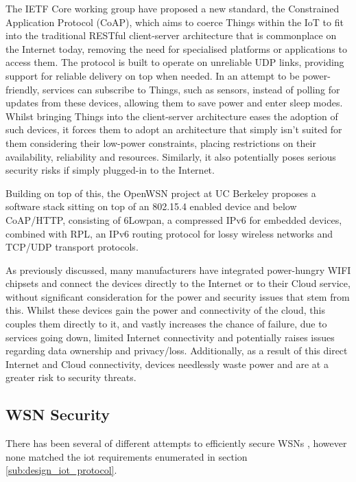 \documentclass[conference]{./sty/IEEEtran}
\begin{document}
The IETF Core working group have proposed a new standard, the Constrained Application Protocol (CoAP)\cite{IETF_COAP_HTTP}, which aims to coerce Things within the IoT to fit into the traditional RESTful client-server architecture that is commonplace on the Internet today, removing the need for specialised platforms or applications to access them. The protocol is built to operate on unreliable UDP links, providing support for reliable delivery on top when needed. In an attempt to be power-friendly, services can subscribe to Things, such as sensors, instead of polling for updates from these devices, allowing them to save power and enter sleep modes. Whilst bringing Things into the client-server architecture eases the adoption of such devices, it forces them to adopt an architecture that simply isn't suited for them considering their low-power constraints, placing restrictions on their availability, reliability and resources. Similarly, it also potentially poses serious security risks if simply plugged-in to the Internet\cite{BelkinWemo}.

Building on top of this, the OpenWSN project at UC Berkeley proposes a software stack sitting on top of an 802.15.4 enabled device and below CoAP/HTTP, consisting of 6Lowpan, a compressed IPv6 for embedded devices, combined with RPL, an IPv6 routing protocol for lossy wireless networks and TCP/UDP transport protocols.

As previously discussed, many manufacturers have integrated power-hungry WIFI chipsets and connect the devices directly to the Internet or to their Cloud service\cite{SmartThings,Belkin,Twine}, without significant consideration for the power and security issues that stem from this. Whilst these devices gain the power and connectivity of the cloud, this couples them directly to it, and vastly increases the chance of failure, due to services going down, limited Internet connectivity and potentially raises issues regarding data ownership and privacy/loss\cite{Playstation}. Additionally, as a result of this direct Internet and Cloud connectivity, devices needlessly waste power and are at a greater risk to security threats\cite{BelkinWemo,IoTWorm}. 
\subsection{WSN Security} %
\label{sub:wsn_security}
There has been several of different attempts to efficiently secure WSNs \cite{TinySec,MiniSec,TinyECC,TinyPK,TinyPBC,Shi2013235,ContikiSec,MessageBottle,CertificatePairwise,MizanurRahman2010858}, however none matched the iot requirements enumerated in section \ref{sub:design_iot_protocol}.
\end{document}
